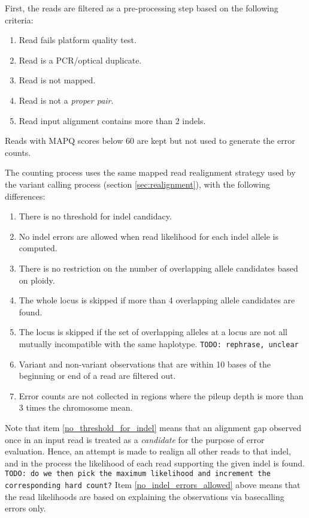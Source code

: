 \documentclass{article}
\begin{document}
First, the reads are filtered as a pre-processing step based on the following criteria:
    \begin{enumerate}
        \item Read fails platform quality test.
        \item Read is a PCR/optical duplicate.
        \item Read is not mapped.
        \item Read is not a \emph{proper pair}.
        \item Read input alignment contains more than 2 indels.
    \end{enumerate}
Reads with MAPQ scores below 60 are kept but not used to generate the error counts.

The counting process uses the same mapped read realignment strategy used by the variant calling process (section \ref{sec:realignment}), with the following differences:
 \begin{enumerate}
    \item \label{no_threshold_for_indel} There is no threshold for indel candidacy.
    \item \label{no_indel_errors_allowed} No indel errors are allowed when read likelihood for each indel allele is computed.
    \item There is no restriction on the number of overlapping allele candidates based on ploidy.
    \item The whole locus is skipped if more than 4 overlapping allele candidates are found.
    \item The locus is skipped if the set of overlapping alleles at a locus are not all mutually incompatible with the same haplotype. {\tt TODO: rephrase, unclear}
    \item Variant and non-variant observations that are within 10 bases of the beginning or end of a read are filtered out.
    \item Error counts are not collected in regions where the pileup depth is more than 3 times the chromosome mean.
 \end{enumerate}

Note that item \ref{no_threshold_for_indel} means that an alignment gap observed once in an input read is treated as a \emph{candidate} for the purpose of error evaluation. Hence, an attempt is made to realign all other reads to that indel, and in the process the likelihood of each read supporting the given indel is found. {\tt TODO: do we then pick the maximum likelihood and increment the corresponding hard count?} Item \ref{no_indel_errors_allowed} above means that the read likelihoods are based on explaining the observations via basecalling errors only.
\end{document}
